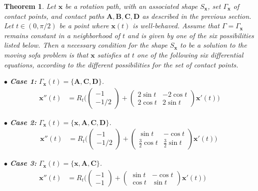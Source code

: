 \documentclass[11pt]{article}
\newtheorem{thm}{Theorem}
\newcommand{\rotmat}[1]{R_{#1}}
\newcommand{\contact}{\Gamma}
\begin{document}
\begin{thm}
\label{thm:odes}
Let $\mathbf{x}$ be a rotation path, with an associated shape $S_{\mathbf{x}}$, set $\contact_{\mathbf{x}}$ of contact points, and contact paths $\mathbf{A}, \mathbf{B}, \mathbf{C}, \mathbf{D}$ as described in the previous section. Let $t\in(0,\pi/2)$ be a point where $\mathbf{x}(t)$ is 
well-behaved. Assume that $\contact=\contact_\mathbf{x}$ remains constant in a neighborhood of $t$ and is given by one of the six possibilities listed below. Then a necessary condition for the shape $S_\mathbf{x}$ to be a solution to the moving sofa problem is that $\mathbf{x}$ satisfies at $t$ one of the following six differential equations, according to the different possibilities for the set of contact points.

\bigskip \noindent $\bullet$
\textbf{Case 1:} $\contact_\mathbf{x}(t)= \{ \mathbf{A}, \mathbf{C}, \mathbf{D} \}$.
\begin{align*}
\mathbf{x}''(t) &=
\rotmat{t}
\Bigg(
\begin{pmatrix}-1 \\-1/2 \end{pmatrix}
+
\begin{pmatrix}
2\sin t & -2\cos t \\ 2\cos t & 2\sin t
\end{pmatrix} \mathbf{x}'(t) \Bigg)
\label{eq:ode1}
\tag{ODE1}
\end{align*}

\medskip \noindent $\bullet$
 \textbf{Case 2:} $\contact_\mathbf{x}(t)= \{ \mathbf{x}, \mathbf{A}, \mathbf{C}, \mathbf{D} \}$.
\begin{align*}\mathbf{x}''(t) &=
\rotmat{t}
\Bigg(
\begin{pmatrix}-1 \\-1/2 \end{pmatrix}
+
\begin{pmatrix}
\sin t & -\cos t \\ \frac32\cos t & \frac32\sin t
\end{pmatrix} \mathbf{x}'(t) \Bigg) \ 
\label{eq:ode2}
\tag{ODE2}
\end{align*}

\medskip \noindent $\bullet$
\textbf{Case 3:} $\contact_\mathbf{x}(t)= \{ \mathbf{x}, \mathbf{A}, \mathbf{C} \}$.
\begin{align*}
\mathbf{x}''(t) &=
\rotmat{t}
\Bigg(
\begin{pmatrix}-1 \\-1 \end{pmatrix}
+
\begin{pmatrix}
\sin t & -\cos t \\ \cos t & \sin t
\end{pmatrix} \mathbf{x}'(t)
\Bigg)
\qquad
\label{eq:ode3}
\tag{ODE3}
\end{align*}


\end{thm}
\end{document}
